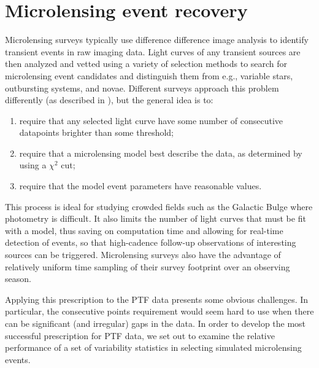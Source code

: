 \documentclass[iop]{emulateapj}
\begin{document}
\section{Microlensing event recovery} \label{sec:event_recovery}
Microlensing surveys typically use difference difference image analysis \citep{alard1998} to identify transient events in raw imaging data. Light curves of any transient sources are then analyzed and vetted using a variety of selection methods to search for microlensing event candidates and distinguish them from e.g., variable stars, outbursting systems, and novae. Different surveys approach this problem differently (as described in \citealt{ogle_optical_depth, con_idx, alcock2000, macho_detection_efficiency, hamadache2009, wyrzykowski2009, sumi2011}), but the general idea is to: 

\begin{enumerate}
	\item require that any selected light curve have some number of consecutive datapoints brighter than some threshold;
	\item require that a microlensing model best describe the data, as determined by using a $\chi^2$ cut;
	\item require that the model event parameters have reasonable values.
\end{enumerate}

This process is ideal for studying crowded fields such as the Galactic Bulge where photometry is difficult. It also limits the number of light curves that must be fit with a model, thus saving on computation time and allowing for real-time detection of events, so that high-cadence follow-up observations of interesting sources can be triggered. Microlensing surveys also have the advantage of relatively uniform time sampling of their survey footprint over an observing season.

Applying this prescription to the PTF data presents some obvious challenges. In particular, the consecutive points requirement would seem hard to use when there can be significant (and irregular) gaps in the data. In order to develop the most successful prescription for PTF data, we set out to examine the relative performance of a set of variability statistics in selecting simulated microlensing events.
\end{document}
